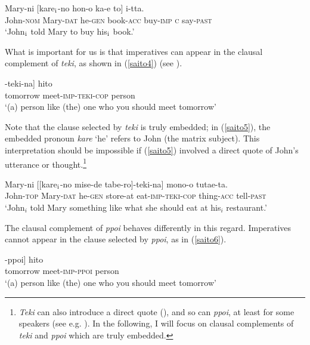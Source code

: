 \documentclass[output=paper]{langscibook}
\begin{document}
\begin{exe}
\ex \label{saito3}
 {Mary-ni} [{kare$_{\textnormal{i}}$-no} {hon-o} {ka-e} {to}] {i-tta}.\\
John-\textsc{nom} Mary-\textsc{dat} he-\textsc{gen} book-\textsc{acc} buy-\textsc{imp} \textsc{c} say-\textsc{past}\\ 
\glt `John$_{\textnormal{i}}$ told Mary to buy his$_{\textnormal{i}}$ book.’     
\end{exe}

What is important for us is that imperatives can appear in the clausal complement of \emph{teki}, as shown in (\ref{saito4}) (see \citealt{Saito2017}).

\begin{exe}
\ex \label{saito4}
\gll [[{asita} {a-e}]-{teki-na}] {hito}\\
tomorrow meet-\textsc{imp}-\textsc{teki}-\textsc{cop} person\\ 
\glt ‘(a) person like (the) one who you should meet tomorrow’
\end{exe}

Note that the clause selected by \emph{teki} is truly embedded; in (\ref{saito5}), the embedded pronoun \emph{kare} ‘he’ refers to John (the matrix subject). This interpretation should be impossible if (\ref{saito5}) involved a direct quote of John’s utterance or thought.\footnote{\emph{Teki} can also introduce a direct quote (\citealt{Saito2017}), and so can \emph{ppoi}, at least for some speakers (see e.g. \citealt{Ohara2010}). In the following, I will focus on clausal complements of \emph{teki} and \emph{ppoi} which are truly embedded.}

\begin{exe}
\ex \label{saito5}
  {Mary-ni} [[{kare$_{\textnormal{i}}$-no} {mise-de} {tabe-ro}]-{teki-na}] {mono-o} {tutae-ta}.\\
John-\textsc{top} Mary-\textsc{dat} he-\textsc{gen} store-at eat-\textsc{imp-teki-cop} thing-\textsc{acc} tell-\textsc{past}\\ 
\glt `John$_{i}$ told Mary something like what she should eat at his$_{i}$ restaurant.’ 
\end{exe}

The clausal complement of \emph{ppoi} behaves differently in this regard. Imperatives cannot appear in the clause selected by \emph{ppoi}, as in (\ref{saito6}).

\begin{exe}
\ex \label{saito6}
\gll [[{asita} {a-e}]-{ppoi}] {hito}\\
tomorrow meet-\textsc{imp}-\textsc{ppoi} person\\ 
\glt ‘(a) person like (the) one who you should meet tomorrow’
\end{exe}
\end{document}
